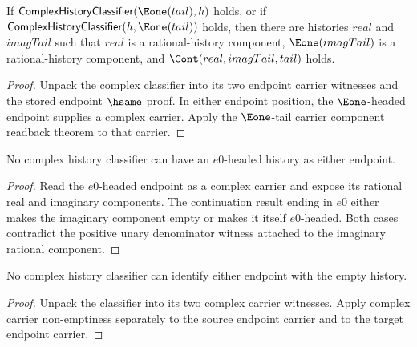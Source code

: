 \begin{theorem}
\label{thm:complex-history-classifier-e1-endpoint-components}
If $\mathsf{ComplexHistoryClassifier}(\Eone(tail),h)$ holds, or if
$\mathsf{ComplexHistoryClassifier}(h,\Eone(tail))$ holds, then there are
histories $real$ and $imagTail$ such that $real$ is a rational-history
component, $\Eone(imagTail)$ is a rational-history component, and
$\Cont(real,imagTail,tail)$ holds.
\end{theorem}
\begin{proof}
Unpack the complex classifier into its two endpoint carrier witnesses and the
stored endpoint $\hsame$ proof. In either endpoint position, the
$\Eone$-headed endpoint supplies a complex carrier. Apply the
$\Eone$-tail carrier component readback theorem to that carrier.
\end{proof}

\begin{theorem}
\label{thm:complex-history-classifier-e0-endpoint-absurd}
No complex history classifier can have an \(e0\)-headed history as either
endpoint.
\end{theorem}
\begin{proof}
Read the \(e0\)-headed endpoint as a complex carrier and expose its rational
real and imaginary components. The continuation result ending in \(e0\) either
makes the imaginary component empty or makes it itself \(e0\)-headed. Both
cases contradict the positive unary denominator witness attached to the
imaginary rational component.
\end{proof}

\begin{theorem}
\label{thm:complex-history-classifier-empty-endpoint-absurd}
No complex history classifier can identify either endpoint with the empty
history.
\end{theorem}
\begin{proof}
Unpack the classifier into its two complex carrier witnesses. Apply complex
carrier non-emptiness separately to the source endpoint carrier and to the
target endpoint carrier.
\end{proof}

